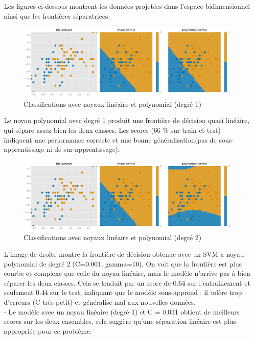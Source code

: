 \documentclass[12pt,a4paper]{report}
\begin{document}
Les figures ci-dessous montrent les données projetées dans l'espace bidimensionnel ainsi que les frontières séparatrices.
\begin{figure}[H]
    \centering
    \includegraphics[width=1\linewidth]{images/iris.png}
    \caption{ Classifications avec noyaux linéaire et polynomial (degré 1)}
    \label{fig:placeholder}
\end{figure}
Le noyau polynomial avec degré 1 produit une frontière de décision quasi linéaire, qui sépare assez bien les deux classes. Les scores (66 \% sur train et test) indiquent une performance correcte et une bonne généralisation(pas de sous-apprentissage ni de sur-apprentissage).
\begin{figure}[H]
    \centering
    \includegraphics[width=1\linewidth]{images/results_deg2.png}
    \caption{Classifications avec noyaux linéaire et polynomial (degré 2)}
    \label{fig:placeholder}
\end{figure}
L’image de droite montre la frontière de décision obtenue avec un SVM à noyau polynomial de degré 2 (C=0.001, gamma=10). On voit que la frontière est plus courbe et complexe que celle du noyau linéaire, mais le modèle n’arrive pas à bien séparer les deux classes. Cela se traduit par un score de 0.64 sur l’entraînement et seulement 0.44 sur le test, indiquant que le modèle sous-apprend : il tolère trop d’erreurs (C très petit) et généralise mal aux nouvelles données.\\
-  Le modèle avec un noyau linéaire (degré 1) et C = 0,031 obtient de meilleurs scores sur les deux ensembles, cela suggère qu’une séparation linéaire est plus appropriée pour ce problème.
\end{document}
